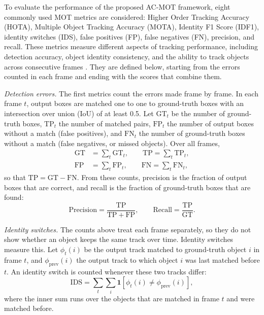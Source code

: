 \documentclass[pdflatex,sn-mathphys-num,iicol]{sn-jnl}
\makeatletter
\def\subsectionfont{\reset@font\fontfamily{\rmdefault}\fontsize{10bp}{12bp}\bfseries\selectfont\raggedright\boldmath}
\renewcommand\subsection{\@startsection{subsection}{2}{\z@}{-7pt \@plus -2pt \@minus -2pt}{3pt}{\subsectionfont}}
\makeatother
\begin{document}
\subsection{MOT Evaluation Metrics}\label{sec:metrics}
To evaluate the performance of the proposed AC-MOT framework, eight commonly
used MOT metrics are considered: Higher Order Tracking
Accuracy (HOTA), Multiple Object Tracking Accuracy (MOTA), Identity F1 Score
(IDF1), identity switches (IDS), false positives (FP), false negatives (FN),
precision, and recall. These metrics measure different aspects of tracking
performance, including detection accuracy, object identity consistency, and
the ability to track objects across consecutive frames
\cite{dendorfer2021motchallenge,luiten2021hota}. They are defined below,
starting from the errors counted in each frame and ending with the scores that
combine them.

\emph{Detection errors.} The first metrics count the errors made frame by
frame. In each frame $t$, output boxes are matched one to one to ground-truth boxes with an intersection over union (IoU) of at least 0.5. Let $\mathrm{GT}_t$ be
the number of ground-truth boxes, $\mathrm{TP}_t$ the number of matched pairs,
$\mathrm{FP}_t$ the number of output boxes without a match (false positives),
and $\mathrm{FN}_t$ the number of ground-truth boxes without a match (false
negatives, or missed objects). Over all frames,
\begin{align}
\mathrm{GT}&=\sum_t \mathrm{GT}_t,\qquad \mathrm{TP}=\sum_t \mathrm{TP}_t,\label{eq:gt}\\
\mathrm{FP}&=\sum_t \mathrm{FP}_t,\qquad \mathrm{FN}=\sum_t \mathrm{FN}_t,\label{eq:fpfn}
\end{align}
so that $\mathrm{TP}=\mathrm{GT}-\mathrm{FN}$. From these counts, precision
is the fraction of output boxes that are correct, and recall is the fraction of ground-truth
boxes that are found:
\begin{equation}
\mathrm{Precision}=\frac{\mathrm{TP}}{\mathrm{TP}+\mathrm{FP}},\qquad
\mathrm{Recall}=\frac{\mathrm{TP}}{\mathrm{GT}}.
\label{eq:prrc}
\end{equation}

\emph{Identity switches.} The counts above treat each frame separately, so
they do not show whether an object keeps the same track over time. Identity
switches measure this. Let $\phi_t(i)$ be the output track matched to
ground-truth object $i$ in frame $t$, and $\phi_{\mathrm{prev}}(i)$ the
output track to which object $i$ was last matched before $t$. An identity
switch is counted whenever these two tracks differ:
\begin{equation}
\mathrm{IDS}=\sum_t\sum_{i}\mathbf{1}\!\left[\phi_t(i)\neq\phi_{\mathrm{prev}}(i)\right],
\label{eq:ids}
\end{equation}
where the inner sum runs over the objects that are matched in frame $t$ and
were matched before.
\end{document}

